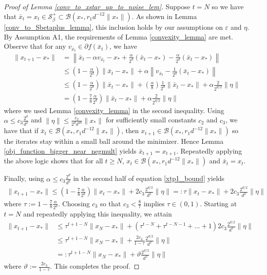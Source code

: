 \documentclass[11pt]{article}
\renewcommand{\epsilon}{\varepsilon}
\newcommand{\al}{\alpha}
\newcommand{\Seps}{\mathcal{S}}
\theoremstyle{remark}
\begin{document}
\begin{proof}[Proof of Lemma \ref{conv_to_xstar_up_to_noise_lem}]

Suppose $t = N$ so we have that $\bar{x}_t = x_t \in \Seps_{\beta}^+ \subset \mathcal{B}(x_*,r_1d^{-12}\|x_*\|)$. As shown in Lemma \ref{conv_to_Sbetaplus_lemma}, this inclusion holds by our assumptions on $\epsilon$ and $\eta$. By Assumption A1, the requirements of Lemma \ref{convexity_lemma} are met. Observe that for any $v_{\bar{x}_t} \in \partial f(\bar{x}_t)$, we have \begin{align}
    \|x_{t+1}-x_*\| & = \left\|\bar{x}_t - \al v_{\bar{x}_t} - x_* + \frac{\al}{2^{d}}(\bar{x}_t-x_*) - \frac{\al}{2^{d}}(\bar{x}_t-x_*)\right\| \nonumber \\
    & \leqslant \left(1- \frac{\al}{2^d}\right)\|\bar{x}_t-x_*\| + \al\left\|v_{\bar{x}_t} - \frac{1}{2^d}(\bar{x}_t- x_*)\right\| \nonumber \\
    & \leqslant \left(1 - \frac{\al}{2^d}\right)\|\bar{x}_t-x_*\| + \left(\frac{\al}{8}\right)\frac{1}{2^d}\|\bar{x}_t-x_*\| + \al\frac{2}{2^{d/2}}\|\eta\| \nonumber\\
    & = \left(1 - \frac{7}{8}\frac{\al}{2^d}\right)\|\bar{x}_t-x_*\|+ \al\frac{2}{2^{d/2}}\|\eta\| \label{xtp1_bound}
\end{align} where we used Lemma \ref{convexity_lemma} in the second inequality. Using $\al \leqslant c_3\frac{2^d}{d^2}$ and $\|\eta\| \leqslant \frac{c_2}{2^dd^{48}}\|x_*\|$ for sufficiently small constants $c_2$ and $c_3$, we have that if $\bar{x}_t \in \mathcal{B}(x_*,r_1d^{-12}\|x_*\|)$, then $x_{t+1} \in \mathcal{B}(x_*,r_1d^{-12}\|x_*\|)$ so the iterates stay within a small ball around the minimizer. Hence Lemma \ref{obj_function_bigger_near_negmult} yields $\bar{x}_{t+1} = x_{t+1}$. Repeatedly applying the above logic shows that for all $t \geqslant N$, $x_t \in \mathcal{B}(x_*, r_1d^{-12}\|x_*\|)$ and $\bar{x}_t = x_t$.

Finally, using $\al \leqslant c_3\frac{2^d}{d^2}$ in the second half of equation \eqref{xtp1_bound} yields\begin{align*}
    \|x_{t+1} - x_*\| \leqslant \left(1 - \frac{7}{8}\frac{\al}{2^d}\right)\|x_t-x_*\| + 2c_3\frac{2^{d/2}}{d^2}\|\eta\| =: \tau\|x_t-x_*\|+ 2c_3\frac{2^{d/2}}{d^2}\|\eta\|
\end{align*} where $\tau := 1 - \frac{7}{8}\frac{\al}{2^d}$. Choosing $c_3$ so that $c_3 < \frac{8}{7}$ implies $\tau \in (0,1)$. Starting at $t = N$ and repeatedly applying this inequality, we attain \begin{align*}
   \|x_{t+1} - x_*\| & \leqslant \tau^{t+1-N}\|x_N-x_*\| + (\tau^{t-N} + \tau^{t-N-1} + \dots + 1)2c_3 \frac{2^{d/2}}{d^2}\|\eta\|\\
    & \leqslant \tau^{t+1-N}\|x_N-x_*\| + \frac{2c_3}{1-\tau}\frac{2^{d/2}}{d^2}\|\eta\| \\
    & =: \tau^{t+1-N}\|x_N-x_*\| + \vartheta\frac{2^{d/2}}{d^2}\|\eta\|
\end{align*} where $\vartheta := \frac{2c_3}{1 - \tau}.$ This completes the proof. \end{proof}
\end{document}
